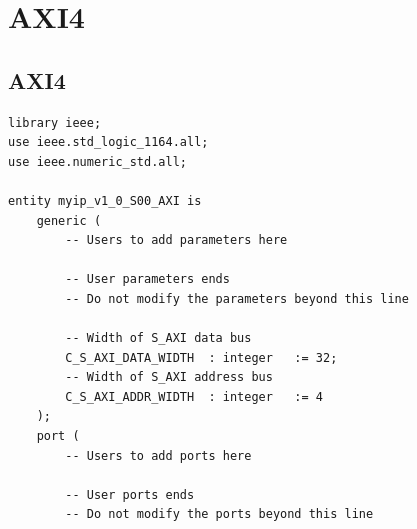 \documentclass[a4paper,openright,12pt]{report}
\begin{document}
 \chapter{ AXI4}\label{aped.C}
 
 \section{AXI4}

\begin{lstlisting}
library ieee;
use ieee.std_logic_1164.all;
use ieee.numeric_std.all;

entity myip_v1_0_S00_AXI is
	generic (
		-- Users to add parameters here

		-- User parameters ends
		-- Do not modify the parameters beyond this line

		-- Width of S_AXI data bus
		C_S_AXI_DATA_WIDTH	: integer	:= 32;
		-- Width of S_AXI address bus
		C_S_AXI_ADDR_WIDTH	: integer	:= 4
	);
	port (
		-- Users to add ports here

		-- User ports ends
		-- Do not modify the ports beyond this line


\end{lstlisting}
\end{document}
